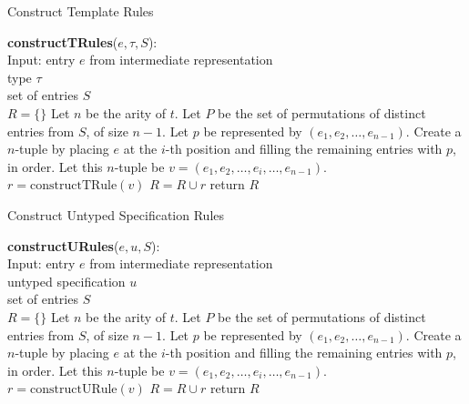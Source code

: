 \begin{algorithm}
\caption{Construct Template Rules}
\label{alg:crules}
  \begin{algorithmic}[1]
  \State \textbf{constructTRules}($e, \tau, S$):\\
    Input: entry $e$ from intermediate representation\\ 
     \qquad \enspace \enspace type $\tau$\\
     \qquad \enspace \enspace set of entries $S$\\
     $R = \{\}$
        \State Let $n$ be the arity of $t$.
        \State Let $P$ be the set of permutations of distinct entries from $S$, of size $n-1$. 
         \State Let $p$ be represented by $(e_1, e_2, \ldots, e_{n-1})$.
           \State Create a $n$-tuple by placing $e$ at the $i$-th position and filling the remaining entries with $p$, in order. Let this $n$-tuple be $v = (e_1, e_2, \ldots, e_i, \ldots, e_{n-1})$.
           \State $r = \textrm{constructTRule}(v)$ 
              $R = R \cup r$
            \EndIf
          \EndFor
        \EndFor
     \EndFor
     \State return $R$
  \end{algorithmic}
\end{algorithm}

\begin{algorithm}
\caption{Construct Untyped Specification Rules}
\label{alg:curules}
  \begin{algorithmic}[1]
  \State \textbf{constructURules}($e, u, S$):\\
    Input: entry $e$ from intermediate representation\\ 
     \qquad \enspace \enspace untyped specification $u$\\
     \qquad \enspace \enspace set of entries $S$\\
     $R = \{\}$
        \State Let $n$ be the arity of $t$.
        \State Let $P$ be the set of permutations of distinct entries from $S$, of size $n-1$. 
         \State Let $p$ be represented by $(e_1, e_2, \ldots, e_{n-1})$.
           \State Create a $n$-tuple by placing $e$ at the $i$-th position and filling the remaining entries with $p$, in order. Let this $n$-tuple be $v = (e_1, e_2, \ldots, e_i, \ldots, e_{n-1})$.
           \State $r = \textrm{constructURule}(v)$ 
              $R = R \cup r$
            \EndIf
          \EndFor
        \EndFor
     \State return $R$
  \end{algorithmic}
\end{algorithm}


